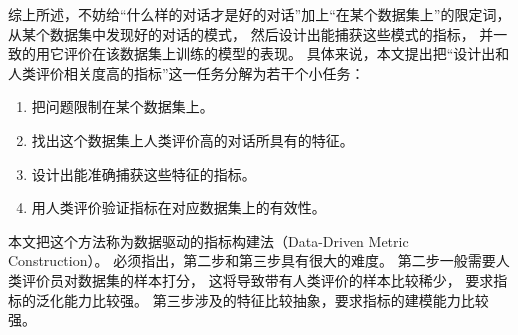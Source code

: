 综上所述，不妨给“什么样的对话才是好的对话”加上“在某个数据集上”的限定词，
从某个数据集中发现好的对话的模式，
然后设计出能捕获这些模式的指标，
并一致的用它评价在该数据集上训练的模型的表现。
具体来说，本文提出把“设计出和人类评价相关度高的指标”这一任务分解为若干个小任务：
\begin{enumerate}
    \item 把问题限制在某个数据集上。
    \item 找出这个数据集上人类评价高的对话所具有的特征。
    \item 设计出能准确捕获这些特征的指标。
    \item 用人类评价验证指标在对应数据集上的有效性。
\end{enumerate}

本文把这个方法称为数据驱动的指标构建法（Data-Driven Metric Construction）。
必须指出，第二步和第三步具有很大的难度。
第二步一般需要人类评价员对数据集的样本打分，
这将导致带有人类评价的样本比较稀少，
要求指标的泛化能力比较强。
第三步涉及的特征比较抽象，要求指标的建模能力比较强。

